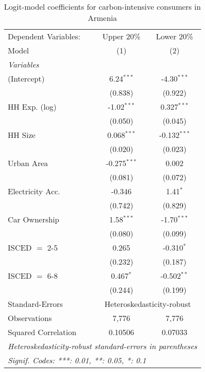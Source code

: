 
\begin{table}[htbp!]
   \centering
   \small
   \begin{adjustbox}{width = 1\textwidth, max height = 0.95\textheight, center}
      \begin{threeparttable}[b]
         \caption{\label{tab:Logit_1_ARM} Logit-model coefficients for carbon-intensive consumers in Armenia}
         \begin{tabular}{lcc}
            \tabularnewline \midrule \midrule
            Dependent Variables: & Upper 20\%     & Lower 20\%\\   
            Model                & (1)            & (2)\\  
            \midrule
            \emph{Variables}\\
            (Intercept)          & 6.24$^{***}$   & -4.30$^{***}$\\   
                                 & (0.838)        & (0.922)\\   
            HH Exp. (log)        & -1.02$^{***}$  & 0.327$^{***}$\\   
                                 & (0.050)        & (0.045)\\   
            HH Size              & 0.068$^{***}$  & -0.132$^{***}$\\   
                                 & (0.020)        & (0.023)\\   
            Urban Area           & -0.275$^{***}$ & 0.002\\   
                                 & (0.081)        & (0.072)\\   
            Electricity Acc.     & -0.346         & 1.41$^{*}$\\   
                                 & (0.742)        & (0.829)\\   
            Car Ownership        & 1.58$^{***}$   & -1.70$^{***}$\\   
                                 & (0.080)        & (0.099)\\   
            ISCED $=$ 2-5        & 0.265          & -0.310$^{*}$\\   
                                 & (0.232)        & (0.187)\\   
            ISCED $=$ 6-8        & 0.467$^{*}$    & -0.502$^{**}$\\   
                                 & (0.244)        & (0.199)\\   
            \midrule 
            Standard-Errors & \multicolumn{2}{c}{Heteroskedasticity-robust} \\ 
            Observations         & 7,776          & 7,776\\  
            Squared Correlation  & 0.10506        & 0.07033\\  
            \midrule \midrule
            \multicolumn{3}{l}{\emph{Heteroskedasticity-robust standard-errors in parentheses}}\\
            \multicolumn{3}{l}{\emph{Signif. Codes: ***: 0.01, **: 0.05, *: 0.1}}\\
         \end{tabular}
         

\end{threeparttable}
\end{adjustbox}
\end{table}
